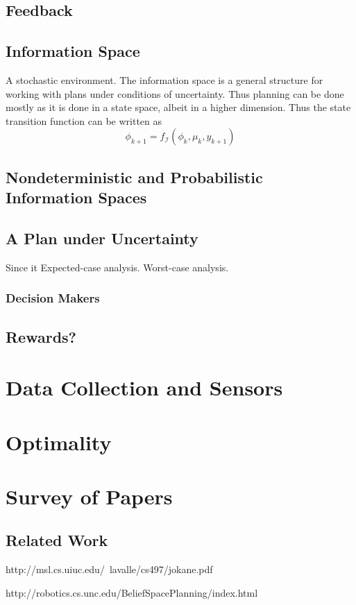 \subsection{Feedback}

\subsection{Information Space}
A stochastic environment.
The information space is a general structure for working with plans under
conditions of uncertainty. Thus planning can be done mostly as it is done in a
state space, albeit in a higher dimension. Thus the state transition function
can be written as
\[
  \phi_{k+1} = f_{\mathcal{I}}\left( \phi_k, \mu_k, y_{k+1} \right)
\]

\subsection{Nondeterministic and Probabilistic Information Spaces}

\subsection{A Plan under Uncertainty}
Since it
Expected-case analysis. Worst-case analysis.

\subsubsection{Decision Makers}

\subsection{Rewards?}

\section{Data Collection and Sensors}



\section{Optimality}



\section{Survey of Papers}

\subsection{Related Work}

http://msl.cs.uiuc.edu/~lavalle/cs497/jokane.pdf

http://robotics.cs.unc.edu/BeliefSpacePlanning/index.html
